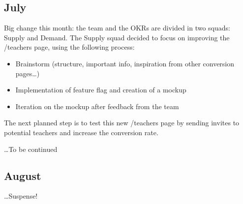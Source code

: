 \subsection{July}
\label{ssec:july}

Big change this month: the team and the OKRs are divided in two squads: Supply and Demand.
The Supply squad decided to focus on improving the /teachers page, using the following process:

\begin{itemize}
\item Brainstorm (structure, important info, inspiration from other conversion pages\ldots)
\item Implementation of feature flag and creation of a mockup
\item Iteration on the mockup after feedback from the team
\end{itemize}

The next planned step is to test this new /teachers page by sending invites to potential teachers and increase the conversion rate.

\ldots To be continued

\subsection{August}
\label{ssec:august}

\ldots Suspense!

